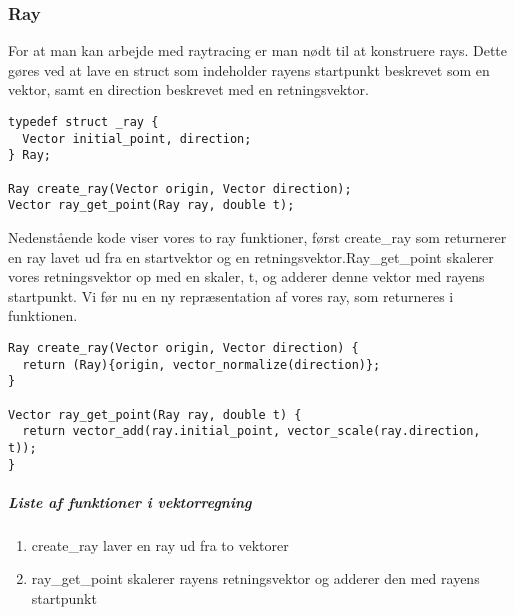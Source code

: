 \subsubsection{Ray}
For at man kan arbejde med raytracing er man nødt til at konstruere rays. Dette gøres ved at lave en struct som indeholder rayens startpunkt beskrevet som en vektor, samt en direction beskrevet med en retningsvektor. 

\begin{lstlisting}[style=Cstyle, caption=ray funktioner og struct]
typedef struct _ray {
  Vector initial_point, direction;
} Ray;

Ray create_ray(Vector origin, Vector direction);
Vector ray_get_point(Ray ray, double t);
\end{lstlisting}

Nedenstående kode viser vores to ray funktioner, først create\_ray som returnerer en ray lavet ud fra en startvektor og en retningsvektor.\newline Ray\_get\_point skalerer vores retningsvektor op med en skaler, t, og adderer denne vektor med rayens startpunkt. Vi før nu en ny repræsentation af vores ray, som returneres i funktionen.

\begin{lstlisting}[style=Cstyle, caption=funktionerne create\_ray og ray\_get\_point]
Ray create_ray(Vector origin, Vector direction) {
  return (Ray){origin, vector_normalize(direction)};
}

Vector ray_get_point(Ray ray, double t) {
  return vector_add(ray.initial_point, vector_scale(ray.direction, t));
}
\end{lstlisting}

\subparagraph{Liste af funktioner i vektorregning}
\begin{enumerate}
  
  \item create\_ray laver en ray ud fra to vektorer
  \item ray\_get\_point skalerer rayens retningsvektor og adderer den med rayens startpunkt
  
\end{enumerate}
